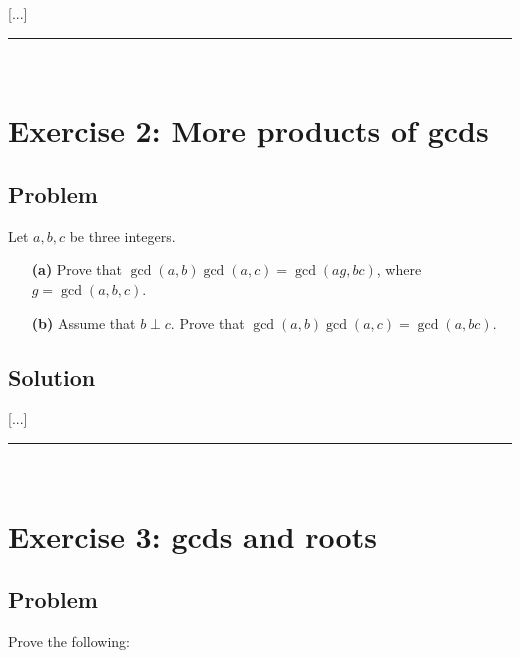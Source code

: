 \documentclass[paper=a4, fontsize=12pt]{scrartcl} %
\newcommand{\tup}[1]{\left( #1 \right)}
\newcommand{\horrule}[1]{\rule{\linewidth}{#1}} %
\theoremstyle{plainsl}
\theoremstyle{definition}
\theoremstyle{remark}
\begin{document}
[...]

\horrule{0.3pt} \\[0.4cm]

\section{Exercise 2: More products of gcds}

\subsection{Problem}

Let $a, b, c$ be three integers.

\begin{enumerate}

\item[\textbf{(a)}]
Prove that
$\gcd\tup{a, b} \gcd\tup{a, c}
= \gcd\tup{ag, bc}$,
where $g = \gcd\tup{a, b, c}$.

\item[\textbf{(b)}]
Assume that $b \perp c$.
Prove that
$\gcd\tup{a, b} \gcd\tup{a, c} = \gcd\tup{a, bc}$.

\end{enumerate}

\subsection{Solution}

[...]

\horrule{0.3pt} \\[0.4cm]

\section{Exercise 3: gcds and roots}

\subsection{Problem}

Prove the following:
\end{document}
